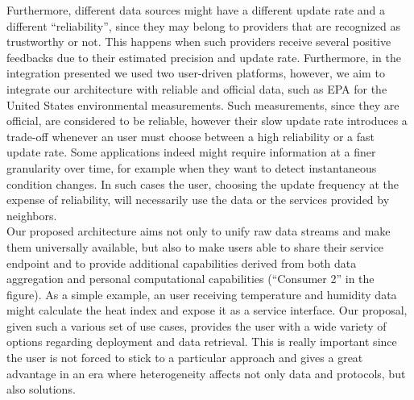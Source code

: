 Furthermore, different data sources might have a different update rate and a different ``reliability'', since they may belong to providers that are recognized as trustworthy or not.
This happens when such providers receive several positive feedbacks due to their estimated precision and update rate.
Furthermore, in the integration presented we used two user-driven platforms, however, we aim to integrate our architecture with reliable and official data, such as EPA for the United States environmental measurements.
Such measurements, since they are official, are considered to be reliable, however their slow update rate introduces a trade-off whenever an user must choose between a high reliability or a fast update rate.
Some applications indeed might require information at a finer granularity over time, for example when they want to detect instantaneous condition changes.
In such cases the user, choosing the update frequency at the expense of reliability, will necessarily use the data or the services provided by neighbors.
\\
Our proposed architecture aims not only to unify raw data streams and make them universally available, but also to make users able to share their service endpoint and to provide additional capabilities derived from both data aggregation and personal computational capabilities (``Consumer 2'' in the figure).
As a simple example, an user receiving temperature and humidity data might calculate the heat index and expose it as a service interface. Our proposal, given such a various set of use cases, provides the user with a wide variety of options regarding deployment and data retrieval.
This is really important since the user is not forced to stick to a particular approach and gives a great advantage in an era where heterogeneity affects not only data and protocols, but also solutions.
